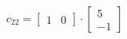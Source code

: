\documentclass[preview]{standalone}
\begin{document}
\begin{align*}
c_{22} = \begin{bmatrix} 1 & 0 \end{bmatrix} \cdot \begin{bmatrix} 5 \\ -1 \end{bmatrix}
\end{align*}
\end{document}

